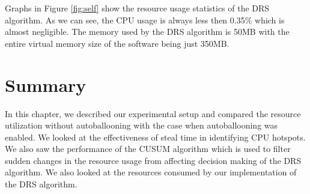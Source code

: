 Graphs in Figure \ref{fig:self} show the resource usage statistics of the DRS algorithm. As we can see, the CPU usage is always less then 0.35\% which is almost negligible. The memory used by the DRS algorithm is 50MB with the entire virtual memory size of the software being just 350MB.

\section*{Summary}
In this chapter, we described our experimental setup and compared the resource utilization without autoballooning with the case when autoballooning was enabled. We looked at the effectiveness of steal time in identifying CPU hotspots. We also saw the performance of the CUSUM algorithm which is used to filter sudden changes in the resource usage from affecting decision making of the DRS algorithm. We also looked at the resources consumed by our implementation of the DRS algorithm.
